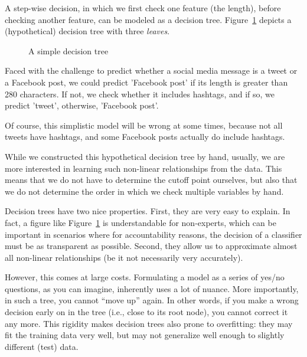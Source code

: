 A step-wise decision, in which we first check one feature (the
length), before checking another feature, can be modeled as a decision
tree.  Figure~\ref{fig:decisiontree} depicts a (hypothetical) decision
tree with three \textit{leaves}.

\begin{figure}
  \centering
{}
  \caption{\label{fig:decisiontree}A simple decision tree}
\end{figure}

Faced with the challenge to predict whether a social media message is
a tweet or a Facebook post, we could predict 'Facebook post' if its
length is greater than 280 characters. If not, we check whether it
includes hashtags, and if so, we predict 'tweet', otherwise, 'Facebook
post'.

Of course, this simplistic model will be wrong at some times, because
not all tweets have hashtags, and some Facebook posts actually do
include hashtags.

While we constructed this hypothetical decision tree by hand, usually,
we are more interested in learning such non-linear relationships from
the data.  This means that we do not have to determine the cutoff
point ourselves, but also that we do not determine the order in which
we check multiple variables by hand.

Decision trees have two nice properties. First, they are very easy to
explain.  In fact, a figure like Figure~\ref{fig:decisiontree} is
understandable for non-experts, which can be important in scenarios
where for accountability reasons, the decision of a classifier must be
as transparent as possible.  Second, they allow us to approximate
almost all non-linear relationships (be it not necessarily very
accurately).

However, this comes at large costs.  Formulating a model as a series
of yes/no questions, as you can imagine, inherently uses a lot of
nuance. More importantly, in such a tree, you cannot ``move up''
again. In other words, if you make a wrong decision early on in the
tree (i.e., close to its root node), you cannot correct it any more.
This rigidity makes decision trees also prone to overfitting: they may
fit the training data very well, but may not generalize well enough to
slightly different (test) data.

